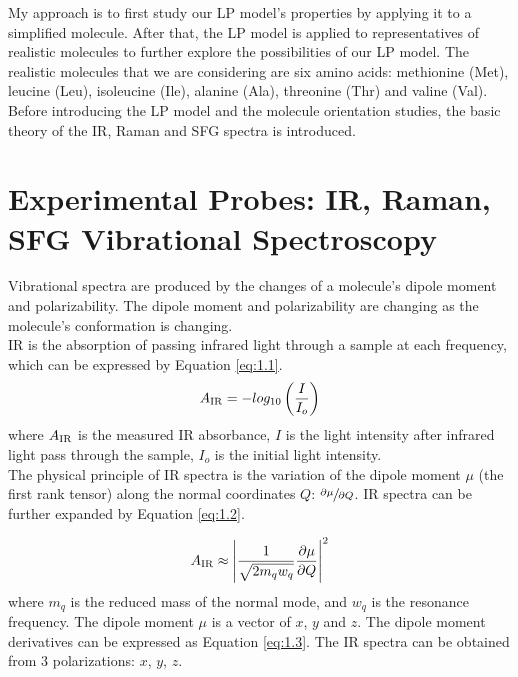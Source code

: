 My approach is to first study our LP model's properties by applying it to a simplified molecule. After that, the LP model is applied to representatives of realistic molecules to further explore the possibilities of our LP model. The realistic molecules that we are considering are six amino acids: methionine (Met), leucine (Leu), isoleucine (Ile), alanine (Ala), threonine (Thr) and valine (Val).\\

Before introducing the LP model and the molecule orientation studies, the basic theory of  the IR, Raman and SFG spectra is introduced.\\

\section{Experimental Probes: IR, Raman, SFG Vibrational Spectroscopy}
Vibrational spectra are produced by the changes of a molecule's dipole moment and polarizability. The dipole moment and polarizability are changing as the molecule's conformation is changing. \\

IR is the absorption of passing infrared light through a sample at each frequency, which can be expressed by Equation \ref{eq:1.1}. \\

\begin{equation} \label{eq:1.1}
A_{\rm IR} = - log_{10} \left( \frac{I}{I_{o}} \right)
\end{equation}
where $A_{\rm IR}$ is the measured IR absorbance, $I$ is the light intensity after infrared light pass through the sample, $I_{o}$ is the initial light intensity. \\

The physical principle of IR spectra is the variation of the dipole moment $\mu$ (the first rank tensor) along the normal coordinates $Q$: $\sfrac{\partial\mu}{\partial Q}$. IR spectra can be further expanded by Equation \ref{eq:1.2}.

\begin{equation} \label{eq:1.2}
A_{\rm IR} \approx \left| \frac{1}{\sqrt{2m_{q}w_{q}}} \frac{\partial\mu}{\partial Q} \right|^{2}
\end{equation}
where $m_{q}$ is the reduced mass of the normal mode, and $w_{q}$ is the resonance frequency. The dipole moment $\mu$ is a vector of $x$, $y$ and $z$. The dipole moment derivatives can be expressed as Equation \ref{eq:1.3}. The IR spectra can be obtained from 3 polarizations: $x$, $y$, $z$. \\

